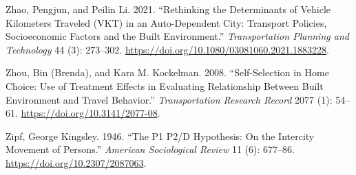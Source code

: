 \documentclass[
  11pt,
  openany]{memoir}
\newlength{\cslhangindent}
\newlength{\cslentryspacingunit} %
\newenvironment{CSLReferences}[2] %
 {%
  \setlength{\parindent}{0pt}
  \ifodd #1
  \let\oldpar\par
  \def\par{\hangindent=\cslhangindent\oldpar}
  \fi
  \setlength{\parskip}{#2\cslentryspacingunit}
 }%
 {}
\begin{document}
\begin{CSLReferences}{1}{0}
\leavevmode{}%
Zhao, Pengjun, and Peilin Li. 2021. {``Rethinking the Determinants of Vehicle Kilometers Traveled ({VKT}) in an Auto-Dependent City: Transport Policies, Socioeconomic Factors and the Built Environment.''} \emph{Transportation Planning and Technology} 44 (3): 273--302. \url{https://doi.org/10.1080/03081060.2021.1883228}.

\leavevmode{}%
Zhou, Bin (Brenda), and Kara M. Kockelman. 2008. {``Self-{Selection} in {Home Choice}: Use of {Treatment Effects} in {Evaluating Relationship Between Built Environment} and {Travel Behavior}.''} \emph{Transportation Research Record} 2077 (1): 54--61. \url{https://doi.org/10.3141/2077-08}.

\leavevmode{}%
Zipf, George Kingsley. 1946. {``The {P1 P2}/{D Hypothesis}: On the {Intercity Movement} of {Persons}.''} \emph{American Sociological Review} 11 (6): 677--86. \url{https://doi.org/10.2307/2087063}.

\end{CSLReferences}
\end{document}
